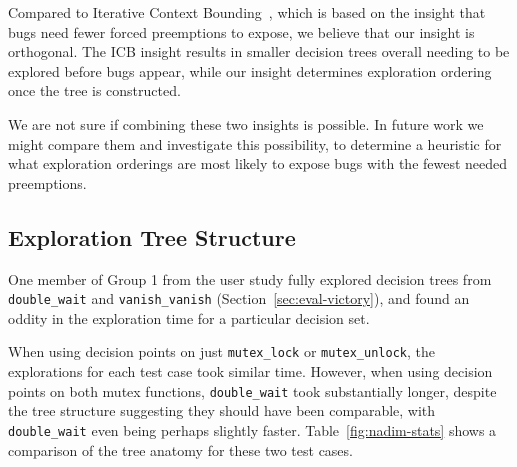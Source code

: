 
Compared to Iterative Context Bounding~\cite{chess}, which is based on the insight that bugs need fewer forced preemptions to expose, we believe that our insight is orthogonal. The ICB insight results in smaller decision trees overall needing to be explored before bugs appear, while our insight determines exploration ordering once the tree is constructed.

We are not sure if combining these two insights is possible. In future work we might compare them and investigate this possibility, to determine a heuristic for what exploration orderings are most likely to expose bugs with the fewest needed preemptions.

\subsection{Exploration Tree Structure}
\label{sec:future-nadim}

One member of Group 1 from the user study fully explored decision trees from \texttt{double\_wait} and \texttt{vanish\_vanish} (Section~\ref{sec:eval-victory}), and found an oddity in the exploration time for a particular decision set.

When using decision points on just \texttt{mutex\_lock} or \texttt{mutex\_unlock}, the explorations for each test case took similar time. However, when using decision points on both mutex functions, \texttt{double\_wait} took substantially longer, despite the tree structure suggesting they should have been comparable, with \texttt{double\_wait} even being perhaps slightly faster. Table~\ref{fig:nadim-stats} shows a comparison of the tree anatomy for these two test cases.

